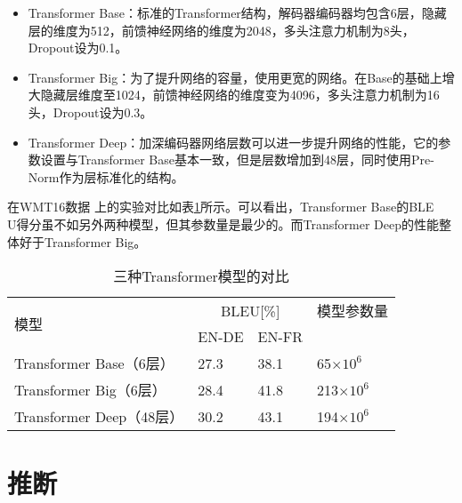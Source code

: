 \begin{itemize}
\vspace{0.5em}
\item  Transformer Base：标准的Transformer结构，解码器编码器均包含6层，隐藏层的维度为512，前馈神经网络的维度为2048，多头注意力机制为8头，Dropout设为0.1。
\vspace{0.5em}
\item  Transformer Big：为了提升网络的容量，使用更宽的网络。在Base的基础上增大隐藏层维度至1024，前馈神经网络的维度变为4096，多头注意力机制为16头，Dropout设为0.3。
\vspace{0.5em}
\item Transformer Deep：加深编码器网络层数可以进一步提升网络的性能，它的参数设置与Transformer Base基本一致，但是层数增加到48层，同时使用Pre-Norm作为层标准化的结构。
\vspace{0.5em}
\end{itemize}

\parinterval 在WMT16数据 上的实验对比如表\ref{tab:12-3}所示。可以看出，Transformer Base的BLE\\U得分虽不如另外两种模型，但其参数量是最少的。而Transformer Deep的性能整体好于Transformer Big。

\begin{table}[htp]
\centering
\caption{三种Transformer模型的对比}
\label{tab:12-3}
\begin{tabular}{l | l l l}
\multirow{2}{*}{模型}   & \multicolumn{2}{c}{BLEU[\%]} & 模型参数量 \\
                      & EN-DE  & EN-FR  &                                  \\ \hline
Transformer Base（6层）     & 27.3            & 38.1            & 65$\times 10^{6}$                \\
Transformer Big（6层）      & 28.4            & 41.8            & 213$\times 10^{6}$               \\
Transformer Deep（48层） & 30.2            & 43.1            & 194$\times 10^{6}$              \\
\end{tabular}
\end{table}

\sectionnewpage
\section{推断}

